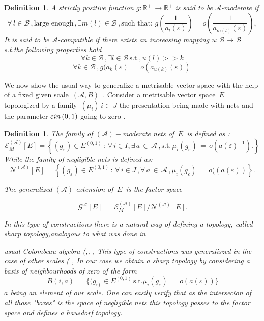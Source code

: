 \documentclass[12pt,a4paper]{amsart}
\newcommand{\RR}{\mathbb R}
\newtheorem{definition}[theorem]{Definition}
\begin{document}
 \begin{definition}
 
 
A strictly positive function $g: \RR^+ \,\rightarrow \RR^+$
is said to be  $ \mathcal{A}$-moderate if 
  $$\forall\,l \in \mathcal{B}\,,\mbox{large enough}\, ,    \exists m(l) \in\mathcal{B}\,,
  \mbox{such that} :\, g(\frac{1}{a_l(\varepsilon)}) =
   o(\frac{1}{a_{m(l)}(\varepsilon)}) ,$$
   It is said to be $ \mathcal{A}$-compatible if 
 there exists an increasing mapping
  $ u:\mathcal{B} 
\rightarrow \mathcal{B}$ s.t.the following properties hold
$$ \forall k\in \mathcal{B}\,, \exists l\in \mathcal{B}\,
 \mbox{s.t.},
u(l) >> k$$
$$ \forall k\in \mathcal{B}\,, g(a_k(\varepsilon)\,=
\,o(a_{u(k)}(\varepsilon))\,
  $$
\end{definition}

We now show the usual way to generalize a metrisable vector space with the help of a fixed given scale
 $\,(\mathcal{A},B)\,$ . Consider a metrisable vector space
 $ \,E\,$ topologized by a family $\,(\mu_i)\,i\in\,J$ the presentation being made with nets and the parameter
  $\varepsilon \\in\,(0,1)$ going to zero .
 
\begin{definition}

The family of $(\mathcal{A})-$moderate nets of $\,E\,$ is defined as :
\begin{equation*}
\mathcal{E}^{(\mathcal{A})}_M [E] = 
\left\{(g_{\varepsilon}) \in E^{(0,1)}\,:\, \forall \,
i\in I, \exists\,a\,\in\,\mathcal{A}\,,\mbox{s.t.}\,
\mu_i(g_\varepsilon)\,=\,
    o(a(\varepsilon)^{-1}).
    \right\}
\end{equation*} 
 While the family of negligible nets is defined as:
\begin{equation*}
\mathcal{N}^{(\mathcal{A})} [E] = \left\{(g_{\varepsilon}) \in E^{(0,1)}\,:\, \forall \,i\in J\, , \forall\,a\,\in\,\mathcal{A}\,,
\mu_i(g_\varepsilon)\,
=\,o((a(\varepsilon))
    \right\}.
\end{equation*} 

The generalized $(\mathcal{A})$-extension of $\,E\,$
is the factor space

$$\,\mathcal{G}^{\mathcal{A}}[E]\,=\,
\mathcal{E}^{(\mathcal{A})}_M [E]/\mathcal{N}^{(\mathcal{A})} [E]. $$
 
In this type of constructions there is a natural way of defining 
a topology, called sharp topology,analogous to what was done in 

usual Colombeau algebra (\cite{S.1},\cite{S.2},\cite{S.4}
 \cite{G.1}, \cite{G.2} This type of constructions was generaliszed in the case of other scales ( \cite{D.S.1}
 ,\cite{D.S.2}
 In our case we obtain a sharp topology by considering a basis  
of neighbourhoods of zero of the form
$$\,B(i,a)\,=\,\{(g_{\varepsilon)}\,\in E^{(0,1)}\,\mbox{s.t.}
\mu_i(g_\varepsilon)\,=\,o(a(\varepsilon)) \}$$
$a$ being an element of our scale. 
 One can easily verify that as the intersecion of all those "boxes" is the space of negligible nets this topology passes to the factor space and defines a hausdorf topology. 

  
\end{definition}
\end{document}
